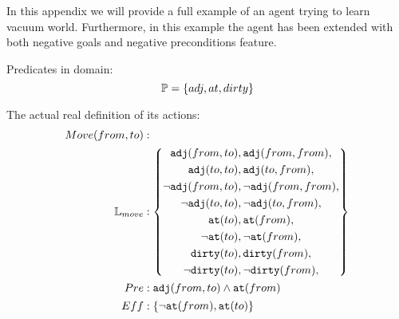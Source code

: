 \documentclass[\master/Master.tex]{subfiles}
\begin{document}
In this appendix we will provide a full example of an agent trying to learn vacuum world. 
Furthermore, in this example the agent has been extended with both negative goals and negative preconditions feature.

Predicates in domain: 
\begin{equation*}
	\mathbb{P} = \{adj,at,dirty\}
\end{equation*}

The actual real definition of its actions:
\begin{align*}
	Move(from,to) &: \\
	\mathbb{L}_{move} &: 
			\left\{
				\begin{gathered}
					\texttt{adj}(from,to), \texttt{adj}(from,from), \\
					\texttt{adj}(to,to), \texttt{adj}(to,from), \\
					\neg \texttt{adj}(from,to), \neg \texttt{adj}(from,from), \\
					\neg \texttt{adj}(to,to), \neg \texttt{adj}(to,from), \\					
					\texttt{at}(to), \texttt{at}(from), \\
					\neg \texttt{at}(to), \neg \texttt{at}(from), \\					
					\texttt{dirty}(to), \texttt{dirty}(from), \\
					\neg \texttt{dirty}(to), \neg \texttt{dirty}(from), \\
				\end{gathered}
				\right\}
				\\
	Pre &: 
	\begin{gathered}
		\texttt{adj}(from,to) \land \texttt{at}(from)\\
	\end{gathered}
	\\
	Eff &: \{
	\begin{gathered}
		\neg \texttt{at}(from), \texttt{at}(to)\\
	\end{gathered}\}
	\\
\end{align*}
\end{document}
